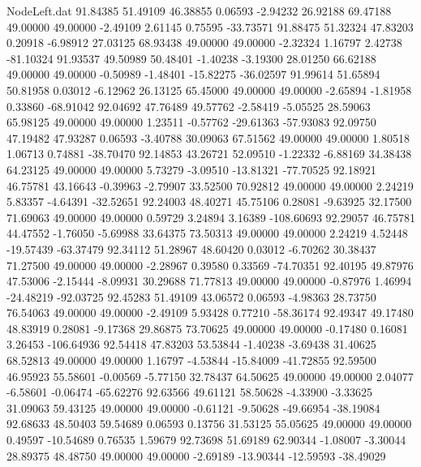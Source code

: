 \begin{filecontents}{NodeLeft.dat}
  91.84385   51.49109   46.38855     0.06593   -2.94232   26.92188   69.47188   49.00000   49.00000   -2.49109    2.61145    0.75595  -33.73571
  91.88475   51.32324   47.83203     0.20918   -6.98912   27.03125   68.93438   49.00000   49.00000   -2.32324    1.16797    2.42738  -81.10324
  91.93537   49.50989   50.48401    -1.40238   -3.19300   28.01250   66.62188   49.00000   49.00000   -0.50989   -1.48401  -15.82275  -36.02597
  91.99614   51.65894   50.81958     0.03012   -6.12962   26.13125   65.45000   49.00000   49.00000   -2.65894   -1.81958    0.33860  -68.91042
  92.04692   47.76489   49.57762    -2.58419   -5.05525   28.59063   65.98125   49.00000   49.00000    1.23511   -0.57762  -29.61363  -57.93083
  92.09750   47.19482   47.93287     0.06593   -3.40788   30.09063   67.51562   49.00000   49.00000    1.80518    1.06713    0.74881  -38.70470
  92.14853   43.26721   52.09510    -1.22332   -6.88169   34.38438   64.23125   49.00000   49.00000    5.73279   -3.09510  -13.81321  -77.70525
  92.18921   46.75781   43.16643    -0.39963   -2.79907   33.52500   70.92812   49.00000   49.00000    2.24219    5.83357   -4.64391  -32.52651
  92.24003   48.40271   45.75106     0.28081   -9.63925   32.17500   71.69063   49.00000   49.00000    0.59729    3.24894    3.16389 -108.60693
  92.29057   46.75781   44.47552    -1.76050   -5.69988   33.64375   73.50313   49.00000   49.00000    2.24219    4.52448  -19.57439  -63.37479
  92.34112   51.28967   48.60420     0.03012   -6.70262   30.38437   71.27500   49.00000   49.00000   -2.28967    0.39580    0.33569  -74.70351
  92.40195   49.87976   47.53006    -2.15444   -8.09931   30.29688   71.77813   49.00000   49.00000   -0.87976    1.46994  -24.48219  -92.03725
  92.45283   51.49109   43.06572     0.06593   -4.98363   28.73750   76.54063   49.00000   49.00000   -2.49109    5.93428    0.77210  -58.36174
  92.49347   49.17480   48.83919     0.28081   -9.17368   29.86875   73.70625   49.00000   49.00000   -0.17480    0.16081    3.26453 -106.64936
  92.54418   47.83203   53.53844    -1.40238   -3.69438   31.40625   68.52813   49.00000   49.00000    1.16797   -4.53844  -15.84009  -41.72855
  92.59500   46.95923   55.58601    -0.00569   -5.77150   32.78437   64.50625   49.00000   49.00000    2.04077   -6.58601   -0.06474  -65.62276
  92.63566   49.61121   58.50628    -4.33900   -3.33625   31.09063   59.43125   49.00000   49.00000   -0.61121   -9.50628  -49.66954  -38.19084
  92.68633   48.50403   59.54689     0.06593    0.13756   31.53125   55.05625   49.00000   49.00000    0.49597  -10.54689    0.76535    1.59679
  92.73698   51.69189   62.90344    -1.08007   -3.30044   28.89375   48.48750   49.00000   49.00000   -2.69189  -13.90344  -12.59593  -38.49029

\end{filecontents}
